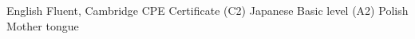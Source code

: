 \begin{cvhonors}
  \cvhonor
    {English}
    {Fluent, Cambridge CPE Certificate (C2)}
    {}
    {}
  \cvhonor
    {Japanese}
    {Basic level (A2)}
    {}
    {}
  \cvhonor
    {Polish}
    {Mother tongue}
    {}
    {}
\end{cvhonors}
